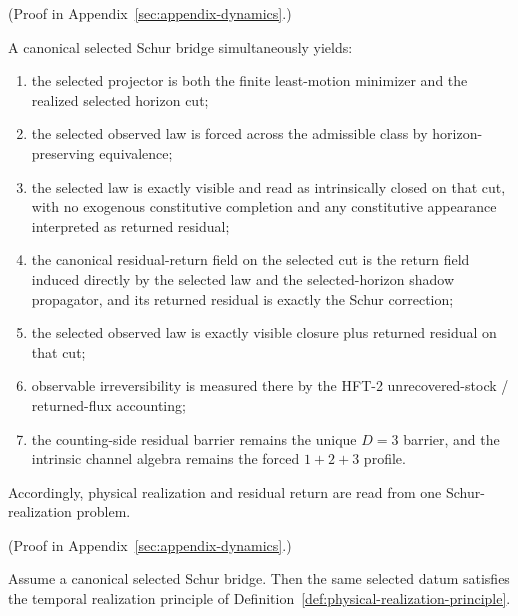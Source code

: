 (Proof in Appendix~\ref{sec:appendix-dynamics}.)

\begin{theorem}
\label{thm:canonical-selected-schur-realization}
A canonical selected Schur bridge simultaneously yields:
\begin{enumerate}[label=(\alph*), leftmargin=2em, itemsep=0.2em]
\item the selected projector is both the finite least-motion minimizer and the
      realized selected horizon cut;
\item the selected observed law is forced across the admissible class by
      horizon-preserving equivalence;
\item the selected law is exactly visible and read as intrinsically closed on
      that cut, with no exogenous constitutive completion and any constitutive
      appearance interpreted as returned residual;
\item the canonical residual-return field on the selected cut is the return
      field induced directly by the selected law and the selected-horizon
      shadow propagator, and its returned residual is exactly the Schur
      correction;
\item the selected observed law is exactly visible closure plus returned
      residual on that cut;
\item observable irreversibility is measured there by the HFT-2
      unrecovered-stock / returned-flux accounting;
\item the counting-side residual barrier remains the unique \(D=3\) barrier,
      and the intrinsic channel algebra remains the forced \(1+2+3\) profile.
\end{enumerate}
Accordingly, physical realization and residual return are read from one
Schur-realization problem.
\end{theorem}

(Proof in Appendix~\ref{sec:appendix-dynamics}.)

\begin{corollary}
\label{cor:canonical-selected-schur-realization-yields-temporal-realization}
Assume a canonical selected Schur bridge. Then the same selected datum
satisfies the temporal realization principle of
Definition~\ref{def:physical-realization-principle}.
\end{corollary}

